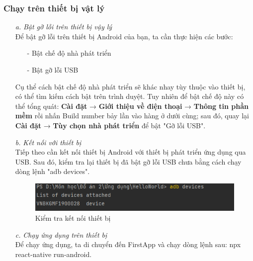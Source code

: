 \subsubsection{Chạy trên thiết bị vật lý}
\begin{enumerate}
    \item[\textit{a.}] {\textit{Bật gỡ lỗi trên thiết bị vậy lý}}\\
    Để bật gỡ lỗi trên thiết bị Android của bạn, ta cần thực hiện các bước:
    \begin{enumerate}
        \item[-] Bật chế độ nhà phát triển
        \item[-] Bật gỡ lỗi USB
    \end{enumerate}
    Cụ thể cách bật chế độ nhà phát triển sẽ khác nhay tùy thuộc vào thiết bị, có thể tìm kiếm cách bật trên trình duyệt. Tuy nhiên để bật chế độ này có thể tổng quát: \textbf{Cài đặt} → \textbf{Giới thiệu về điện thoại} → \textbf{Thông tin phần mềm} rồi nhấn Build number bảy lần vào hàng ở dưới cùng; sau đó, quay lại \textbf{Cài đặt} → \textbf{Tùy chọn nhà phát triển} để bật "Gỡ lỗi USB".
    \item[\textit{b.}] {\textit{Kết nối với thiết bị}}\\
    Tiếp theo cần kết nối thiết bị Android với thiết bị phát triển ứng dụng qua USB. Sau đó, kiểm tra lại thiết bị đã bật gỡ lỗi USB chưa bằng cách chạy dòng lệnh "adb devices".
    \begin{figure}[!ht]
        \centering
        \includegraphics[scale=0.5]{images/checkDevices.png}
        \caption{Kiểm tra kết nối thiết bị}
    \end{figure}
    \item[\textit{c.}] {\textit{Chạy ứng dụng trên thiết bị}}\\
    Để chạy ứng dụng, ta di chuyển đến FirstApp và chạy dòng lệnh sau: npx react-native run-android.
\end{enumerate}
